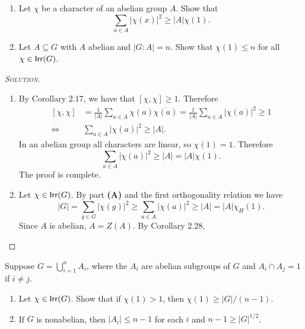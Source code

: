 \newpage
\begin{problem}[2.9]
\hfill
\begin{enumerate}[font=\normalfont,label=\textbf{(\Alph*)}]
  \item Let $\chi$ be a character of an abelian group $A$. Show that
  \[
    \sum_{a \in A} \lvert \chi(x)\rvert^2 \geq \lvert A \rvert \chi(1).
  \]
  \item Let $A\subseteq G$ with $A$ abelian and $\lvert G : A \rvert = n$. Show that $\chi(1) \leq n$ for all $\chi \in \mathsf{Irr}(G)$.
\end{enumerate}
\end{problem}

\begin{proof}[{\scshape Solution}]
  \hfill
  \begin{enumerate}[font=\normalfont,label=\textbf{(\Alph*)}, wide]
    \item By Corollary 2.17, we have that $[\chi, \chi] \geq 1$. Therefore
    \[
    \begin{aligned}
      [\chi, \chi] &= \frac{1}{\lvert A \rvert}\sum_{a \in A} \chi(a)\overline{\chi(a)} = \frac{1}{\lvert A \rvert}\sum_{a \in A} \lvert \chi(a) \rvert^2 \geq 1 \\
      \iff &\sum_{a \in A} \lvert \chi(a) \rvert^2 \geq \lvert A \rvert.
    \end{aligned}
    \]
    In an abelian group all characters are linear, so $\chi(1) = 1$. Therefore
    \[
      \sum_{a \in A} \lvert \chi(a) \rvert^2 \geq \lvert A \rvert = \lvert A \rvert \chi(1).
    \]
    The proof is complete.
    \item Let $\chi \in \mathsf{Irr}(G)$. By part \textbf{(A)} and the first orthogonality relation we have
    \[
      \lvert G \rvert = \sum_{g \in G} \lvert \chi(g) \rvert^2 \geq \sum_{a \in A} \lvert \chi(a) \rvert^2 \geq \lvert A \rvert = \lvert A \rvert \chi_H(1).
    \]
    Since $A$ is abelian, $A = Z(A)$. By Corollary 2.28,
  \end{enumerate}
\end{proof}

\newpage
\begin{problem}[2.10]
Suppose $G = \bigcup_{i=1}^n A_i$, where the $A_i$ are abelian subgroups of $G$ and $A_i \cap A_j = 1$ if $i \neq j$.

\begin{enumerate}[font=\normalfont,label=\textbf{(\Alph*)}]
  \item Let $\chi \in \mathsf{Irr}(G)$. Show that if $\chi(1) > 1$, then $\chi(1) \geq \lvert G \rvert /(n-1)$.
  \item If $G$ is nonabelian, then $\lvert A_i \rvert \leq n-1$ for each $i$ and $n-1 \geq \lvert G \rvert^{1/2}$.
\end{enumerate}
\end{problem}

